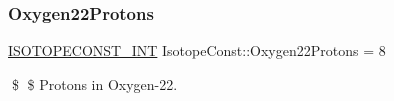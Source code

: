 \subsubsection{\texorpdfstring{Oxygen22\+Protons}{Oxygen22Protons}}
{\footnotesize\ttfamily \mbox{\hyperlink{group___isotope_const-_macros_ga5f18360b3e99483a35c32d789e62621c}{I\+S\+O\+T\+O\+P\+E\+C\+O\+N\+S\+T\+\_\+\+I\+NT}} Isotope\+Const\+::\+Oxygen22\+Protons = 8}

\$ \$ Protons in Oxygen-\/22. 